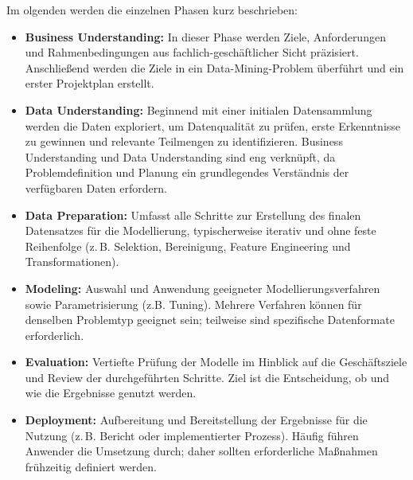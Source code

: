 Im olgenden werden die einzelnen Phasen kurz beschrieben:
\begin{itemize}
	\item \textbf{Business Understanding:}
	In dieser Phase werden Ziele, Anforderungen und Rahmenbedingungen aus fachlich-geschäftlicher Sicht präzisiert. Anschließend werden die Ziele in ein Data-Mining-Problem überführt und ein erster Projektplan erstellt. \cite{wirth2000crisp}
	
	\item \textbf{Data Understanding:}
	Beginnend mit einer initialen Datensammlung werden die Daten exploriert, um Datenqualität zu prüfen, erste Erkenntnisse zu gewinnen und relevante Teilmengen zu identifizieren. Business Understanding und Data Understanding sind eng verknüpft, da Problemdefinition und Planung ein grundlegendes Verständnis der verfügbaren Daten erfordern. \cite{baijens2020applying}
	
	\item \textbf{Data Preparation:}
	Umfasst alle Schritte zur Erstellung des finalen Datensatzes für die Modellierung, typischerweise iterativ und ohne feste Reihenfolge (z.\,B. Selektion, Bereinigung, Feature Engineering und Transformationen). \cite{saltz2017predicting}
	
	\item \textbf{Modeling:}
	Auswahl und Anwendung geeigneter Modellierungsverfahren sowie Parametrisierung (z.B. Tuning). Mehrere Verfahren können für denselben Problemtyp geeignet sein; teilweise sind spezifische Datenformate erforderlich. \cite{chapman_crispdm_2000}
	
	\item \textbf{Evaluation:}
	Vertiefte Prüfung der Modelle im Hinblick auf die Geschäftsziele und Review der durchgeführten Schritte. Ziel ist die Entscheidung, ob und wie die Ergebnisse genutzt werden. \cite{bemthuis2025crisp}
	
	\item \textbf{Deployment:}
	Aufbereitung und Bereitstellung der Ergebnisse für die Nutzung (z.\,B. Bericht oder implementierter Prozess). Häufig führen Anwender die Umsetzung durch; daher sollten erforderliche Maßnahmen frühzeitig definiert werden. \cite{saltz2017predicting}
	
\end{itemize}